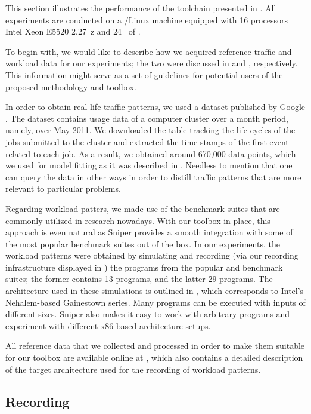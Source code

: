 
This section illustrates the performance of the toolchain presented in
. All experiments are conducted on a /Linux machine
equipped with 16 processors Intel Xeon E5520 2.27~z and 24~ of
.

To begin with, we would like to describe how we acquired reference traffic and
workload data for our experiments; the two were discussed in  and
, respectively. This information might serve as a set of
guidelines for potential users of the proposed methodology and toolbox.

In order to obtain real-life traffic patterns, we used a dataset published by
Google \cite{google}. The dataset contains usage data of a computer cluster over
a month period, namely, over May 2011. We downloaded the table tracking the life
cycles of the jobs submitted to the cluster and extracted the time stamps of the
first event related to each job. As a result, we obtained around 670,000 data
points, which we used for model fitting as it was described in .
Needless to mention that one can query the data in other ways in order to
distill traffic patterns that are more relevant to particular problems.

Regarding workload patters, we made use of the benchmark suites that are
commonly utilized in research nowadays. With our toolbox in place, this approach
is even natural as Sniper provides a smooth integration with some of the most
popular benchmark suites out of the box. In our experiments, the workload
patterns were obtained by simulating and recording (via our recording
infrastructure displayed in ) the programs from the popular
 \cite{bienia2011} and  \cite{cpu2006} benchmark
suites; the former contains 13 programs, and the latter 29 programs. The
architecture used in these simulations is outlined in , which
corresponds to Intel's Nehalem-based Gainestown series. Many programs can be
executed with inputs of different sizes. Sniper also makes it easy to work with
arbitrary programs and experiment with different x86-based architecture setups.

All reference data that we collected and processed in order to make them
suitable for our toolbox are available online at \cite{sources}, which also
contains a detailed description of the target architecture used for the
recording of workload patterns.

\subsection{Recording}


